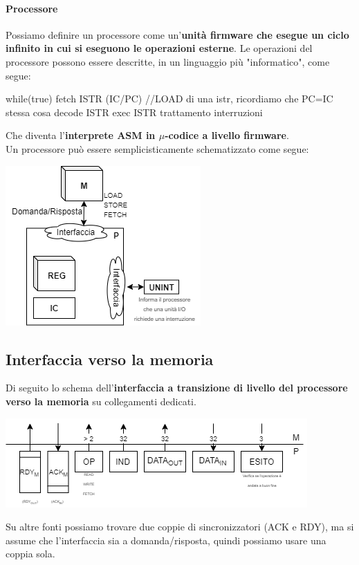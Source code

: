 \documentclass[10pt]{report}
\begin{document}
\paragraph{Processore} Possiamo definire un processore come un'\textbf{unità firmware che esegue un ciclo infinito in cui si eseguono le operazioni esterne}. Le operazioni del processore possono essere descritte, in un linguaggio più "informatico", come segue:
\begin{C}
while(true) {
	fetch ISTR (IC/PC) //LOAD di una istr, ricordiamo che PC=IC stessa cosa
	decode ISTR
	exec ISTR
	trattamento interruzioni
}
\end{C}
Che diventa l'\textbf{interprete ASM in $\mu$-codice a livello firmware}.\\
Un processore può essere semplicisticamente schematizzato come segue:
\begin{center}
\includegraphics[scale=1]{procschema.png}
\end{center}
\pagebreak
\subsection{Interfaccia verso la memoria}
Di seguito lo schema dell'\textbf{interfaccia a transizione di livello del processore verso la memoria} su collegamenti dedicati.
\begin{center}
\includegraphics[scale=1.2]{interfaccia_pm.png}
\end{center}
Su altre fonti possiamo trovare due coppie di sincronizzatori (ACK e RDY), ma si assume che l'interfaccia sia a domanda/risposta, quindi possiamo usare una coppia sola.
\end{document}
